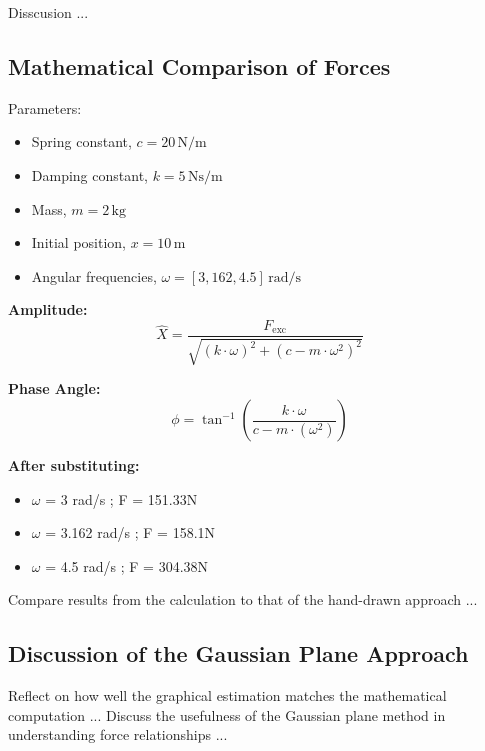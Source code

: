 \documentclass[12pt,a4paper]{article}
\begin{document}
Disscusion ... 

\subsection{Mathematical Comparison of Forces}

Parameters:
\begin{itemize}
    \item Spring constant, \(c = 20 \, \text{N/m}\)
    \item Damping constant, \(k = 5 \, \text{Ns/m}\)
    \item Mass, \(m = 2 \, \text{kg}\)
    \item Initial position, \(x = 10 \, \text{m}\)
    \item Angular frequencies, \(\omega = [3, 162, 4.5] \, \text{rad/s}\)
\end{itemize}

\noindent\textbf{Amplitude:} 
\[
\hat{X} = \frac{F_{\text{exc}}}{\sqrt{(k \cdot \omega)^2 + (c - m \cdot \omega^2)^2}}
\]

\noindent\textbf{Phase Angle:}
\[
\phi = \tan^{-1} \left( \frac{k \cdot \omega}{c - m \cdot (\omega^2)} \right)
\]

\noindent\textbf{After substituting:}
\begin{itemize}
    \item \(\omega\) = 3 rad/s ; F = 151.33N
    \item \(\omega\) = 3.162 rad/s ; F = 158.1N
    \item \(\omega\) = 4.5 rad/s ; F = 304.38N
\end{itemize}

Compare results from the calculation to that of the hand-drawn approach ...

\subsection{Discussion of the Gaussian Plane Approach}
Reflect on how well the graphical estimation matches the mathematical computation ...
{\vspace{5pt}}
Discuss the usefulness of the Gaussian plane method in understanding force relationships ... 
\end{document}
